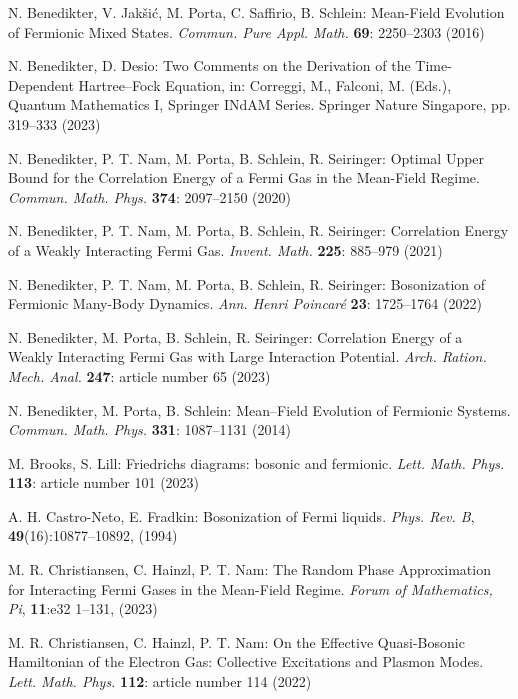 \documentclass[12pt,a4paper]{article}
\numberwithin{equation}{section}
\newcommand{\1}{\mathbb{I}}
\theoremstyle{plain}
\theoremstyle{definition}
\theoremstyle{remark}
\theoremstyle{plain}
\theoremstyle{definition}
\theoremstyle{remark}
\begin{document}
\begin{thebibliography}{29}
N. Benedikter, V. Jakšić, M. Porta, C. Saffirio, B. Schlein:
	Mean-Field Evolution of Fermionic Mixed States.
	\emph{Commun. Pure Appl. Math.} \textbf{69}: 2250--2303 (2016)

N. Benedikter, D. Desio:
	Two Comments on the Derivation of the Time-Dependent Hartree–Fock Equation, in: Correggi, M., Falconi, M. (Eds.), Quantum Mathematics I, Springer INdAM Series. Springer Nature Singapore, pp. 319--333 (2023)

N. Benedikter, P. T. Nam, M. Porta, B. Schlein, R. Seiringer:
	Optimal Upper Bound for the Correlation Energy of a Fermi Gas in the Mean-Field Regime.
	\emph{Commun. Math. Phys.} {\bf 374}: 2097--2150 (2020)

N. Benedikter, P. T. Nam, M. Porta, B. Schlein, R. Seiringer:
	Correlation Energy of a Weakly Interacting Fermi Gas.
	\emph{Invent. Math.} {\bf 225}: 885--979 (2021)
	
N. Benedikter, P. T. Nam, M. Porta, B. Schlein, R. Seiringer:
	Bosonization of Fermionic Many-Body Dynamics.
	\emph{Ann. Henri Poincar\'e} {\bf 23}: 1725--1764 (2022)

N. Benedikter, M. Porta, B. Schlein, R. Seiringer:
	Correlation Energy of a Weakly Interacting Fermi Gas with Large Interaction Potential.
	\emph{Arch. Ration. Mech. Anal.} \textbf{247}: article number 65 (2023)

N. Benedikter, M. Porta, B. Schlein:
	Mean–Field Evolution of Fermionic Systems.
	\emph{Commun. Math. Phys.} \textbf{331}: 1087--1131 (2014)

M. Brooks, S. Lill:
	Friedrichs diagrams: bosonic and fermionic.
	\emph{Lett. Math. Phys.} {\bf 113}: article number 101 (2023)


A. H. Castro-Neto, E. Fradkin:
	Bosonization of {{Fermi}} liquids.
	\emph{Phys. Rev. B}, \textbf{49}(16):10877--10892, (1994)

M. R. Christiansen, C. Hainzl, P. T. Nam:
	The Random Phase Approximation for Interacting Fermi Gases in the Mean-Field Regime.
	\emph{Forum of Mathematics, Pi}, \textbf{11}:e32 1--131, (2023)

M. R. Christiansen, C. Hainzl, P. T. Nam:
	On the Effective Quasi-Bosonic Hamiltonian of the Electron Gas: Collective Excitations and Plasmon Modes.
	\emph{Lett. Math. Phys.} \textbf{112}: article number 114 (2022)


\end{thebibliography}
\end{document}
